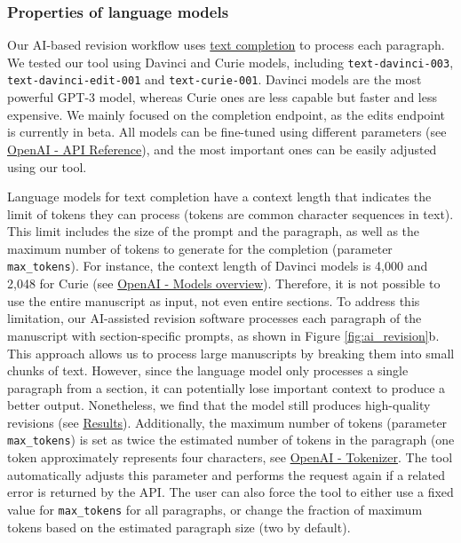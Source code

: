 \documentclass[
]{article}
\begin{document}
\hypertarget{properties-of-language-models}{%
\subsubsection{Properties of language models}\label{properties-of-language-models}}

Our AI-based revision workflow uses \href{https://beta.openai.com/docs/guides/completion}{text completion} to process each paragraph.
We tested our tool using Davinci and Curie models, including \texttt{text-davinci-003}, \texttt{text-davinci-edit-001} and \texttt{text-curie-001}.
Davinci models are the most powerful GPT-3 model, whereas Curie ones are less capable but faster and less expensive.
We mainly focused on the completion endpoint, as the edits endpoint is currently in beta.
All models can be fine-tuned using different parameters (see \href{https://beta.openai.com/docs/api-reference/completions}{OpenAI - API Reference}), and the most important ones can be easily adjusted using our tool.

Language models for text completion have a context length that indicates the limit of tokens they can process (tokens are common character sequences in text).
This limit includes the size of the prompt and the paragraph, as well as the maximum number of tokens to generate for the completion (parameter \texttt{max\_tokens}).
For instance, the context length of Davinci models is 4,000 and 2,048 for Curie (see \href{https://beta.openai.com/docs/models/overview}{OpenAI - Models overview}).
Therefore, it is not possible to use the entire manuscript as input, not even entire sections.
To address this limitation, our AI-assisted revision software processes each paragraph of the manuscript with section-specific prompts, as shown in Figure \ref{fig:ai_revision}b.
This approach allows us to process large manuscripts by breaking them into small chunks of text.
However, since the language model only processes a single paragraph from a section, it can potentially lose important context to produce a better output.
Nonetheless, we find that the model still produces high-quality revisions (see \protect\hyperlink{sec:results}{Results}).
Additionally, the maximum number of tokens (parameter \texttt{max\_tokens}) is set as twice the estimated number of tokens in the paragraph (one token approximately represents four characters, see \href{https://beta.openai.com/tokenizer\%5D}{OpenAI - Tokenizer}.
The tool automatically adjusts this parameter and performs the request again if a related error is returned by the API.
The user can also force the tool to either use a fixed value for \texttt{max\_tokens} for all paragraphs, or change the fraction of maximum tokens based on the estimated paragraph size (two by default).
\end{document}
